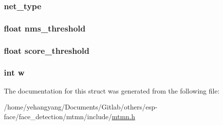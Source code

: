 \subsubsection[{\texorpdfstring{net\+\_\+type}{net_type}}]{ net\+\_\+type}\hypertarget{structnet__config__t_a8f4c2af8911d60345894c9b1cd728a81}{}\label{structnet__config__t_a8f4c2af8911d60345894c9b1cd728a81}
\subsubsection[{\texorpdfstring{nms\+\_\+threshold}{nms_threshold}}]{\setlength{\rightskip}{0pt plus 5cm}float nms\+\_\+threshold}\hypertarget{structnet__config__t_a363bfab5175aae09f069a69ff5072f2c}{}\label{structnet__config__t_a363bfab5175aae09f069a69ff5072f2c}
\subsubsection[{\texorpdfstring{score\+\_\+threshold}{score_threshold}}]{\setlength{\rightskip}{0pt plus 5cm}float score\+\_\+threshold}\hypertarget{structnet__config__t_ace479cfe5e33dac6639cf88d0551b58c}{}\label{structnet__config__t_ace479cfe5e33dac6639cf88d0551b58c}
\subsubsection[{\texorpdfstring{w}{w}}]{\setlength{\rightskip}{0pt plus 5cm}int w}\hypertarget{structnet__config__t_aac374e320caaadeca4874add33b62af2}{}\label{structnet__config__t_aac374e320caaadeca4874add33b62af2}


The documentation for this struct was generated from the following file\+:\begin{DoxyCompactItemize}
\item 
/home/yehangyang/\+Documents/\+Gitlab/others/esp-\/face/face\+\_\+detection/mtmn/include/\hyperlink{mtmn_8h}{mtmn.\+h}\end{DoxyCompactItemize}
